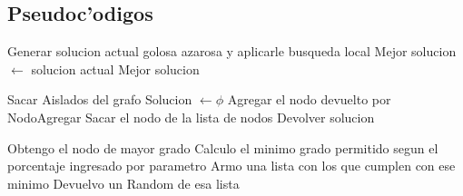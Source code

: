 \subsection{Pseudoc'odigos}

\begin{algorithmic}[1]
	\STATE Generar solucion actual golosa azarosa y aplicarle busqueda local
		\STATE Mejor solucion $\leftarrow$ solucion actual 
	\ENDIF
\ENDWHILE
\RETURN Mejor solucion
\end{algorithmic}

\vspace{2em}

\begin{algorithmic}[1]
\STATE Sacar Aislados del grafo
\STATE Solucion $\leftarrow \phi$
	\STATE Agregar el nodo devuelto por NodoAgregar
	\STATE Sacar el nodo de la lista de nodos
\ENDWHILE
\ELSE
	\STATE Devolver solucion
\ENDIF
\end{algorithmic}
	
\vspace{2em}
	
\begin{algorithmic}[1]
\STATE Obtengo el nodo de mayor grado
\STATE Calculo el minimo grado permitido segun el porcentaje ingresado por parametro
\STATE Armo una lista con los que cumplen con ese minimo
\STATE Devuelvo un Random de esa lista
\end{algorithmic}
